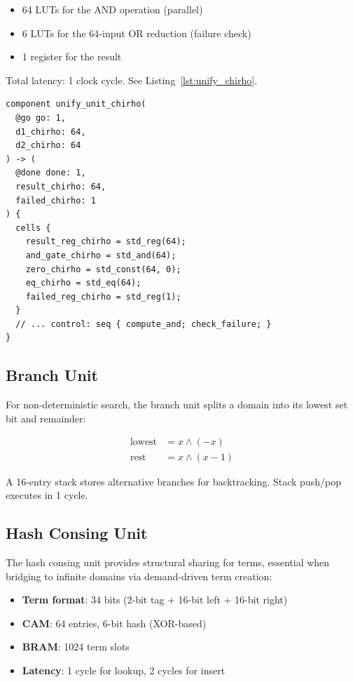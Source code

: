 \documentclass[11pt,a4paper]{article}
\begin{document}
\begin{itemize}
  \item 64 LUTs for the AND operation (parallel)
  \item 6 LUTs for the 64-input OR reduction (failure check)
  \item 1 register for the result
\end{itemize}

Total latency: 1 clock cycle. See Listing~\ref{lst:unify_chirho}.

\begin{lstlisting}[style=calyxstyle_chirho, caption={Unification unit in Calyx IR (excerpt from \texttt{calyx\_chirho/domain\_chirho.futil})}, label={lst:unify_chirho}]
component unify_unit_chirho(
  @go go: 1,
  d1_chirho: 64,
  d2_chirho: 64
) -> (
  @done done: 1,
  result_chirho: 64,
  failed_chirho: 1
) {
  cells {
    result_reg_chirho = std_reg(64);
    and_gate_chirho = std_and(64);
    zero_chirho = std_const(64, 0);
    eq_chirho = std_eq(64);
    failed_reg_chirho = std_reg(1);
  }
  // ... control: seq { compute_and; check_failure; }
}
\end{lstlisting}

\subsection{Branch Unit}
\label{subsec:branch_unit_chirho}

For non-deterministic search, the branch unit splits a domain into its lowest
set bit and remainder:

\begin{align}
  \text{lowest} &= x \land (-x) \\
  \text{rest} &= x \land (x - 1)
\end{align}

A 16-entry stack stores alternative branches for backtracking. Stack push/pop
executes in 1 cycle.

\subsection{Hash Consing Unit}
\label{subsec:hashcons_unit_chirho}

The hash consing unit provides structural sharing for terms, essential when
bridging to infinite domains via demand-driven term creation:

\begin{itemize}
  \item \textbf{Term format}: 34 bits (2-bit tag + 16-bit left + 16-bit right)
  \item \textbf{CAM}: 64 entries, 6-bit hash (XOR-based)
  \item \textbf{BRAM}: 1024 term slots
  \item \textbf{Latency}: 1 cycle for lookup, 2 cycles for insert
\end{itemize}
\end{document}
